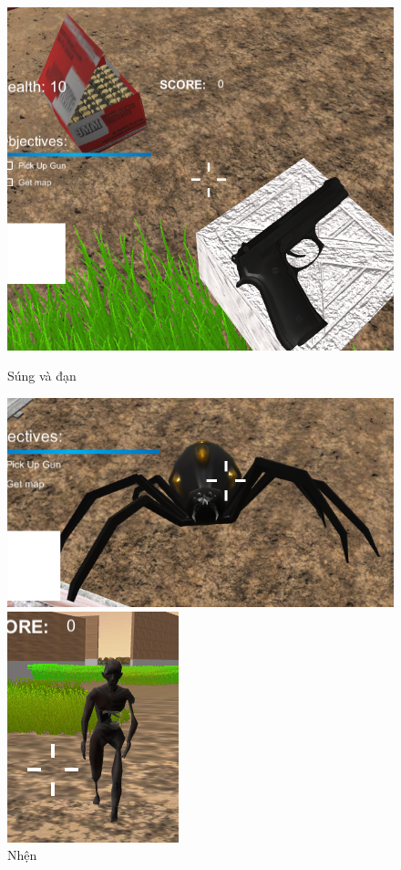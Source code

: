 \documentclass[14pt,a4paper]{extreport}
\begin{document}
\begin{figure}
	\begin{center}
		\includegraphics[scale=.5]{gun.PNG}
	\caption{Súng và đạn}
	\includegraphics[scale=.5]{spider.PNG}
	\caption{Nhện}
	\includegraphics[scale=.5]{zombie.PNG}

\end{center}
\end{figure}
\end{document}
